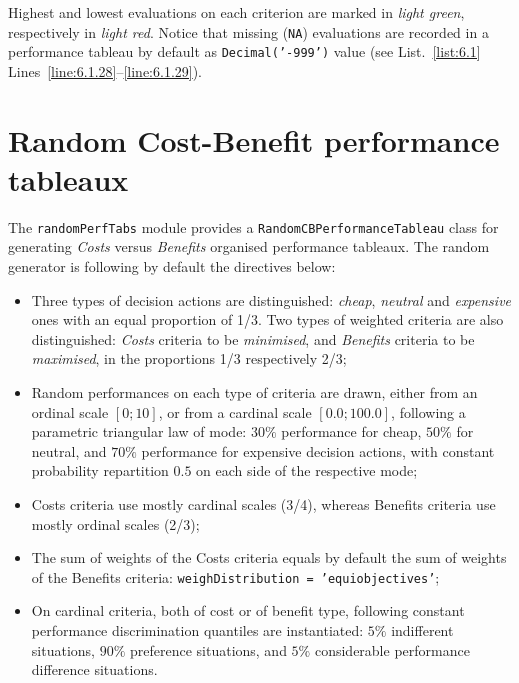 Highest and lowest evaluations on each criterion are marked in \emph{light green}, respectively in \emph{light red}. Notice that missing (\texttt{NA}) evaluations are recorded in a performance tableau by default as \texttt{Decimal('-999')} value (see List.~\vref{list:6.1} Lines~\ref{line:6.1.28}--\ref{line:6.1.29}).

\section{Random Cost-Benefit performance tableaux}
\label{sec:6.3}

The \texttt{randomPerfTabs} module provides a \texttt{RandomCBPerformanceTableau} class for generating \emph{Costs} versus \emph{Benefits} organised performance tableaux. The random generator is following by default the directives below:
\begin{itemize}[leftmargin=0.5cm,rightmargin=0.25cm]
\item Three types of decision actions are distinguished: \emph{cheap}, \emph{neutral} and \emph{expensive} ones with an equal proportion of 1/3. Two types of weighted criteria are also distinguished: \emph{Costs} criteria to be \emph{minimised}, and \emph{Benefits} criteria to be \emph{maximised}, in the proportions 1/3 respectively 2/3;
\item  Random performances on each type of criteria  are drawn, either from an ordinal scale $[0;10]$, or from a cardinal scale $[0.0;100.0]$, following a parametric triangular law of mode: $30\%$ performance for cheap, $50\%$ for neutral, and $70\%$ performance for expensive decision actions, with constant probability repartition $0.5$ on each side of the respective mode;
\item Costs criteria use mostly cardinal scales (3/4), whereas Benefits criteria use mostly ordinal scales (2/3); 
\item  The sum of weights of the Costs criteria equals by default the sum of weights of the Benefits criteria: \texttt{weighDistribution = 'equiobjectives'};
\item On cardinal criteria, both of cost or of benefit type, following constant performance discrimination quantiles are instantiated: $5\%$ indifferent situations, $90\%$ preference situations, and $5\%$ considerable performance difference situations. 
\end{itemize}

